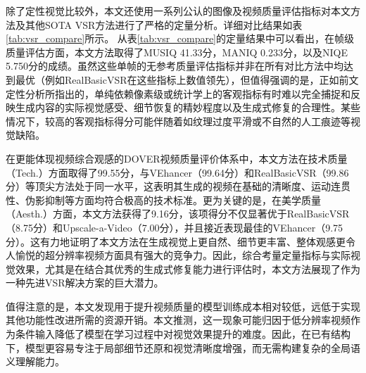 除了定性视觉比较外，本文还使用一系列公认的图像及视频质量评估指标对本文方法及其他SOTA VSR方法进行了严格的定量分析。详细对比结果如表\ref{tab:vsr_compare}所示。
从表\ref{tab:vsr_compare}的定量结果中可以看出，在帧级质量评估方面，本文方法取得了MUSIQ 41.33分，MANIQ 0.233分，以及NIQE 5.750分的成绩。虽然这些单帧的无参考质量评估指标并非在所有对比方法中均达到最优（例如RealBasicVSR在这些指标上数值领先），但值得强调的是，正如前文定性分析所指出的，单纯依赖像素级或统计学上的客观指标有时难以完全捕捉和反映生成内容的实际视觉感受、细节恢复的精妙程度以及生成式修复的合理性。某些情况下，较高的客观指标得分可能伴随着如纹理过度平滑或不自然的人工痕迹等视觉缺陷。

在更能体现视频综合观感的DOVER视频质量评价体系中，本文方法在技术质量（Tech.）方面取得了99.55分，与VEhancer（99.64分）和RealBasicVSR（99.86分）等顶尖方法处于同一水平，这表明其生成的视频在基础的清晰度、运动连贯性、伪影抑制等方面均符合极高的技术标准。更为关键的是，在美学质量（Aesth.）方面，本文方法获得了9.16分，该项得分不仅显著优于RealBasicVSR（8.75分）和Upscale-a-Video（7.00分），并且接近表现最佳的VEhancer（9.75分）。这有力地证明了本文方法在生成视觉上更自然、细节更丰富、整体观感更令人愉悦的超分辨率视频方面具有强大的竞争力。因此，综合考量定量指标与实际视觉效果，尤其是在结合其优秀的生成式修复能力进行评估时，本文方法展现了作为一种先进VSR解决方案的巨大潜力。

值得注意的是，本文发现用于提升视频质量的模型训练成本相对较低，远低于实现其他功能性改进所需的资源开销。本文推测，这一现象可能归因于低分辨率视频作为条件输入降低了模型在学习过程中对视觉效果提升的难度。因此，在已有结构下，模型更容易专注于局部细节还原和视觉清晰度增强，而无需构建复杂的全局语义理解能力。\

